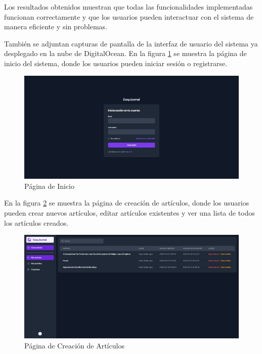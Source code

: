 Los resultados obtenidos muestran que todas las funcionalidades implementadas funcionan correctamente y que los usuarios pueden interactuar con el sistema de manera eficiente y sin problemas. 

También se adjuntan capturas de pantalla de la interfaz de usuario del sistema ya desplegado en la nube de DigitalOcean. En la figura \ref{fig:captura-1} se muestra la página de inicio del sistema, donde los usuarios pueden iniciar sesión o registrarse. 

\begin{figure}[H]
    \centering
    \includegraphics[width=1\textwidth]{IMAGENES/captura-1.png}
    \caption{Página de Inicio}
    \label{fig:captura-1}
\end{figure}

En la figura \ref{fig:captura-2} se muestra la página de creación de artículos, donde los usuarios pueden crear nuevos artículos, editar artículos existentes y ver una lista de todos los artículos creados.

\begin{figure}[H]
    \centering
    \includegraphics[width=1\textwidth]{IMAGENES/captura-2.png}
    \caption{Página de Creación de Artículos}
    \label{fig:captura-2}
\end{figure}

